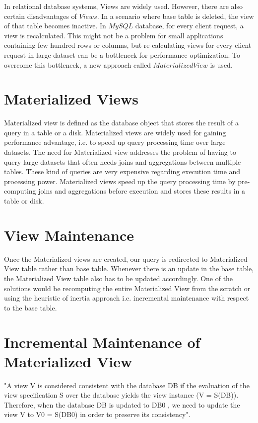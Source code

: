 \documentclass[11pt,a4paper,bibtotoc,idxtotoc,headsepline,footsepline,footexclude,BCOR12mm,DIV13]{scrbook}
\begin{document}
In relational database systems, Views are widely used. However, there are also certain disadvantages of $Views$. In a scenario where base table is deleted, the view of that table becomes inactive. In $MySQL$ database, for every client request, a view is recalculated. This might not be a problem for small applications containing few hundred rows or columns, but re-calculating views for every client request in large dataset can be a bottleneck for performance optimization. To overcome this bottleneck, a new approach called $Materialized View$ is used.


\section{Materialized Views}

Materialized view is defined as the database object that stores the result of a query in a table or a disk. Materialized views are widely used for gaining performance advantage, i.e. to speed up query processing time over large datasets. The need for Materialized view addresses the problem of having to query large datasets that often needs joins and aggregations between multiple tables. These kind of queries are very expensive regarding execution time and processing power. Materialized views speed up the query processing time by pre-computing joins and aggregations before execution and stores these results in a table or disk\cite{materializedview:oracle}. 

\section{View Maintenance}
Once the Materialized views are created, our query is redirected to Materialized View table rather than base table. Whenever there is an update in the base table, the Materialized View table also has to be updated accordingly. One of the solutions would be recomputing the entire Materialized View from the scratch or using the heuristic of inertia\cite{maintenance:materializedviews} approach i.e. incremental maintenance with respect to the base table.

\section{Incremental Maintenance of Materialized View}
"A view V is considered consistent with the database DB if the evaluation of the view specification S over the database yields the view instance (V = S(DB)). Therefore, when the database DB is updated to DB0 , we need to update the view V to V0 = S(DB0) in order to preserve its consistency"\cite{incrementalmaintenance:materializedviews}. 
\end{document}
